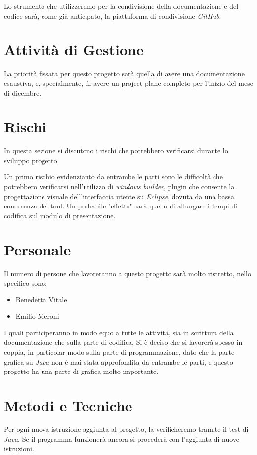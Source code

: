\documentclass{book}
\begin{document}
 Lo strumento che utilizzeremo per la condivisione della documentazione e del codice sarà, come già anticipato, la piattaforma di condivisione \textit{GitHub}.

\section{Attività di Gestione}

La priorità fissata per questo progetto sarà quella di avere una documentazione esaustiva, e, specialmente, di avere un project plane completo per l'inizio del mese di dicembre.


\section{Rischi}

In questa sezione si discutono i rischi che potrebbero verificarsi durante lo sviluppo progetto. 

Un primo rischio evidenzianto da entrambe le parti sono le difficoltà che potrebbero verificarsi nell'utilizzo di \textit{windows builder}, plugin che consente la progettazione visuale dell'interfaccia utente su \textit{Eclipse}, dovuta da una bassa conoscenza del tool. Un probabile "effetto" sarà quello di allungare i tempi di codifica sul modulo di presentazione.

\section{Personale}
Il numero di persone che lavoreranno a questo progetto sarà molto ristretto, nello specifico sono: 
\begin{itemize}
    \item Benedetta Vitale
    \item Emilio Meroni
\end{itemize}
I quali participeranno in modo equo a tutte le attività, sia in scrittura della documentazione che sulla parte di codifica. Si è deciso che si lavorerà spesso in coppia, in particolar modo sulla parte di programmazione, dato che la parte grafica su \textit{Java} non è mai stata approfondita da entrambe le parti, e questo progetto ha una parte di grafica molto importante.
     

\section{Metodi e Tecniche}

Per ogni nuova istruzione aggiunta al progetto, la verificheremo tramite il test di \textit{Java}. Se il programma funzionerà ancora si procederà con l'aggiunta di nuove istruzioni.
\end{document}
